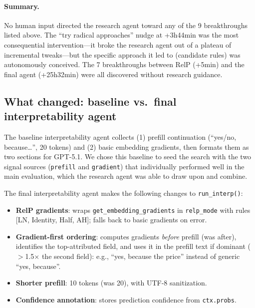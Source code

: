 \documentclass{article} %
\begin{document}
\paragraph{Summary.}
No human input directed the research agent toward any of the 9 breakthroughs listed above.
The ``try radical approaches'' nudge at +3h44min was the most consequential intervention---it broke the research agent out of a plateau of incremental tweaks---but the specific approach it led to (candidate rules) was autonomously conceived.
The 7 breakthroughs between RelP (+5min) and the final agent (+25h32min) were all discovered without research guidance.

\subsection{What changed: baseline vs.\ final interpretability agent}

The baseline interpretability agent collects (1) prefill continuation (``yes/no, because\ldots'', 20 tokens) and (2) basic embedding gradients, then formats them as two sections for GPT-5.1. We chose this baseline to seed the search with the two signal sources (\texttt{prefill} and \texttt{gradient}) that individually performed well in the main evaluation, which the research agent was able to draw upon and combine.

The final interpretability agent makes the following changes to \texttt{run\_interp()}:
\begin{itemize}[nosep,leftmargin=*]
    \item \textbf{RelP gradients}: wraps \texttt{get\_embedding\_gradients} in \texttt{relp\_mode} with rules [LN, Identity, Half, AH]; falls back to basic gradients on error.
    \item \textbf{Gradient-first ordering}: computes gradients \emph{before} prefill (was after), identifies the top-attributed field, and uses it in the prefill text if dominant ($>$1.5$\times$ the second field): e.g., ``yes, because the price'' instead of generic ``yes, because''.
    \item \textbf{Shorter prefill}: 10 tokens (was 20), with UTF-8 sanitization.
    \item \textbf{Confidence annotation}: stores prediction confidence from \texttt{ctx.probs}.
\end{itemize}
\end{document}
